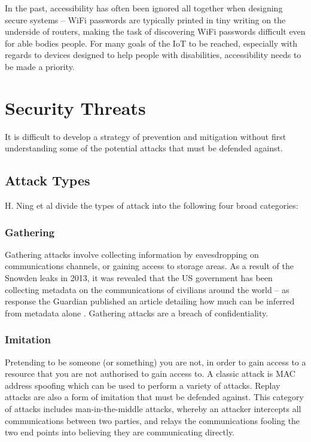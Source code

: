 \documentclass[10pt,journal,compsoc]{IEEEtran}
\begin{document}
In the past, accessibility has often been ignored all together when designing
secure systems -- WiFi passwords are typically printed in tiny writing on the
underside of routers, making the task of discovering WiFi passwords difficult
even for able bodies people. For many goals of the IoT to be reached,
especially with regards to devices designed to help people with disabilities,
accessibility needs to be made a priority.  


\section{Security Threats}
It is difficult to develop a strategy of prevention and mitigation without
first understanding some of the potential attacks that must be defended
against.  

\subsection{Attack Types}
H. Ning et al \cite{Ning2013} divide the types of attack into the following
four broad categories:

\subsubsection{Gathering}
Gathering attacks involve collecting information by eavesdropping on
communications channels, or gaining access to storage areas. As a result of the
Snowden leaks in 2013, it was revealed that the US government has been
collecting metadata on the communications of civilians around the world -- as
response the Guardian published an article detailing how much can be inferred
from metadata alone \cite{Guardian2013}. Gathering attacks are a breach of
confidentiality. 

\subsubsection{Imitation}
Pretending to be someone (or something) you are not, in order to gain access to
a resource that you are not authorised to gain access to. A classic attack is
MAC address spoofing which can be used to perform a variety of attacks. Replay
attacks are also a form of imitation that must be defended against. This
category of attacks includes man-in-the-middle attacks, whereby an attacker
intercepts all communications between two parties, and relays the
communications fooling the two end points into believing they are communicating
directly. 
\end{document}
